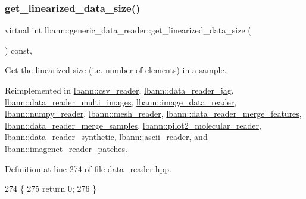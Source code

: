 \subsubsection{\texorpdfstring{get\+\_\+linearized\+\_\+data\+\_\+size()}{get\_linearized\_data\_size()}}
{\footnotesize\ttfamily virtual int lbann\+::generic\+\_\+data\+\_\+reader\+::get\+\_\+linearized\+\_\+data\+\_\+size (\begin{DoxyParamCaption}{ }\end{DoxyParamCaption}) const\hspace{0.3cm}{\ttfamily [inline]}, {\ttfamily [virtual]}}



Get the linearized size (i.\+e. number of elements) in a sample. 



Reimplemented in \hyperlink{classlbann_1_1csv__reader_aa1121a406e7af9e97d82e5a945b3b957}{lbann\+::csv\+\_\+reader}, \hyperlink{classlbann_1_1data__reader__jag_aaf9fbe3e290dc1d4bb13fb203e33e313}{lbann\+::data\+\_\+reader\+\_\+jag}, \hyperlink{classlbann_1_1data__reader__multi__images_a63d7c8f0b674f19840134ee99680f3fc}{lbann\+::data\+\_\+reader\+\_\+multi\+\_\+images}, \hyperlink{classlbann_1_1image__data__reader_a26b8566e76ba99c017a84c49a9dec37c}{lbann\+::image\+\_\+data\+\_\+reader}, \hyperlink{classlbann_1_1numpy__reader_a527f5dd6da76da189b3c4c72a4b129b3}{lbann\+::numpy\+\_\+reader}, \hyperlink{classlbann_1_1mesh__reader_a52c9bccdfed2a06f69023755513f4cde}{lbann\+::mesh\+\_\+reader}, \hyperlink{classlbann_1_1data__reader__merge__features_a9cf5a37a562c5bdd3861da9ec2e54638}{lbann\+::data\+\_\+reader\+\_\+merge\+\_\+features}, \hyperlink{classlbann_1_1data__reader__merge__samples_ae27598202866c365744f21f736421eaa}{lbann\+::data\+\_\+reader\+\_\+merge\+\_\+samples}, \hyperlink{classlbann_1_1pilot2__molecular__reader_ad8d83938c6878019dd0c5945483e0504}{lbann\+::pilot2\+\_\+molecular\+\_\+reader}, \hyperlink{classlbann_1_1data__reader__synthetic_a0eea15c5697e7e7dfd0abaccff3fc2c3}{lbann\+::data\+\_\+reader\+\_\+synthetic}, \hyperlink{classlbann_1_1ascii__reader_adbbcd2eba6b3e0c985dcfaa24cb78aa0}{lbann\+::ascii\+\_\+reader}, and \hyperlink{classlbann_1_1imagenet__reader__patches_a09ce692ca31d52424dea5395ad6c8b2b}{lbann\+::imagenet\+\_\+reader\+\_\+patches}.



Definition at line 274 of file data\+\_\+reader.\+hpp.


\begin{DoxyCode}
274                                                \{
275     \textcolor{keywordflow}{return} 0;
276   \}
\end{DoxyCode}
\mbox{\label{classlbann_1_1generic__data__reader_a99e8ba4f09fdc86d238ad7c8d2e2bce0}} 
